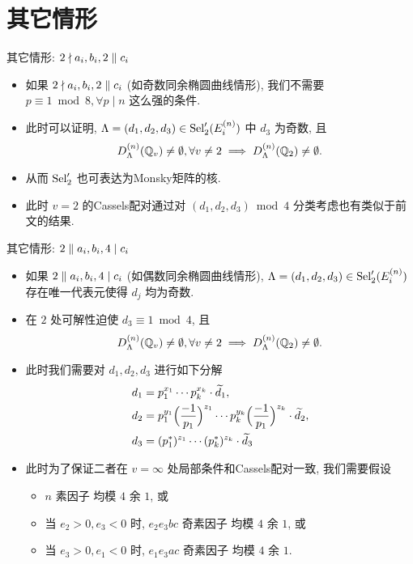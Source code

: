 \documentclass[aspectratio=169]{ctexbeamer}
\begin{document}
\section{其它情形}
\begin{frame}{其它情形: $2\nmid a_i,b_i,2\parallel c_i$}
\begin{itemize}
\item 如果 $2\nmid a_i,b_i,2\parallel c_i$ (如奇数同余椭圆曲线情形), 我们不需要 $p\equiv 1\bmod 8,\forall p\mid n$ 这么强的条件.
\item 此时可以证明, $\Lambda=(d_1,d_2,d_3)\in{\mathrm{Sel}}_2'(E_i^{(n)})$ 中 $d_3$ 为奇数, 且
\[D_{\Lambda}^{(n)}({\mathbb{Q}}_v)\neq\emptyset,\forall v\neq 2
\implies D_{\Lambda}^{(n)}({\mathbb{Q}}_2)\neq\emptyset.\]
\item 从而 ${\mathrm{Sel}}_2'$ 也可表达为Monsky矩阵的核.
\item 此时 $v=2$ 的Cassels配对通过对 $(d_1,d_2,d_3)\bmod 4$ 分类考虑也有类似于前文的结果.
\end{itemize}
\end{frame}


\begin{frame}{其它情形: $2\parallel a_i,b_i, 4\mid c_i$}
\begin{itemize}
\item 如果 $2\parallel a_i,b_i, 4\mid c_i$ (如偶数同余椭圆曲线情形), $\Lambda=(d_1,d_2,d_3)\in{\mathrm{Sel}}_2'(E_i^{(n)})$ 存在唯一代表元使得 $d_j$ 均为奇数.
\item 在 $2$ 处可解性迫使 $d_3\equiv 1\bmod 4$, 且
\[D_{\Lambda}^{(n)}({\mathbb{Q}}_v)\neq\emptyset,\forall v\neq 2
\implies D_{\Lambda}^{(n)}({\mathbb{Q}}_2)\neq\emptyset.\]
\item 此时我们需要对 $d_1,d_2,d_3$ 进行如下分解
\[\begin{split}
	d_1&=p_1^{x_1}\cdots p_k^{x_k}\cdot \widetilde d_1,\\
	d_2&=p_1^{y_1}\Bigl(\frac{{-1}}{p_1}\Bigr)^{z_1}\cdots p_k^{y_k}\Bigl(\frac{{-1}}{p_1}\Bigr)^{z_k}\cdot \widetilde d_2,\\
	d_3&=(p_1^*)^{z_1}\cdots (p_k^*)^{z_k}\cdot \widetilde d_3
\end{split}\]
\item 此时为了保证二者在 $v=\infty$ 处局部条件和Cassels配对一致, 我们需要假设
\begin{itemize}
	\item $n$ 素因子 均模 $4$ 余 $1$, 或
	\item 当 $e_2>0, e_3<0$ 时, $e_2e_3bc$ 奇素因子 均模 $4$ 余 $1$, 或
	\item 当 $e_3>0, e_1<0$ 时, $e_1e_3ac$ 奇素因子 均模 $4$ 余 $1$.
\end{itemize}
\end{itemize}
\end{frame}
\end{document}
